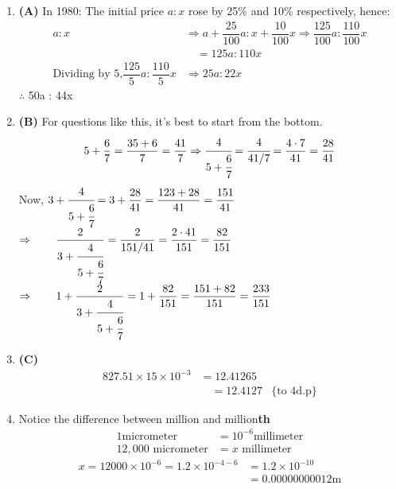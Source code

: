 \begin{multicols}{2}
\begin{enumerate}[label={\textbf{\arabic*.}}]
    \item \textbf{(A)} In 1980: The initial price \(a : x\) rose by 25\% and 10\% respectively, hence:
    \begin{align*}
    a:x &\Rightarrow a + \dfrac{25}{100}a : x + \dfrac{10}{100}x \Rightarrow \dfrac{125}{100}a : \dfrac{110}{100}x \\
    &\quad = 125a : 110x \\
    \text{Dividing by 5,} \dfrac{125}{5} a : \dfrac{110}{5} x &\Rightarrow 25a : 22x
    \end{align*}
    \(\therefore\)  \hspace{20px} 50a : 44x
    
    \item \textbf{(B)} For questions like this, it's best to start from the bottom.
    \[5 + \dfrac{6}{7} = \dfrac{35 + 6}{7} = \dfrac{41}{7} \Rightarrow \cfrac{4}{5 + \cfrac{6}{7}} = \cfrac{4}{41/7} = \dfrac{4 \cdot 7}{41} = \dfrac{28}{41}\]
    Now, \(3 + \cfrac{4}{5 + \cfrac{6}{7}} = 3 + \dfrac{28}{41} = \dfrac{123 + 28}{41} = \dfrac{151}{41}\)
    \vspace{10pt}
    \(\Rightarrow \hspace{20px} \dfrac{2}{3 + \cfrac{4}{5 + \cfrac{6}{7}}} = \dfrac{2}{151/41} = \dfrac{2 \cdot 41}{151} = \dfrac{82}{151}\)
    \vspace{10pt}
    \(\Rightarrow \hspace{20px} 1 + \dfrac{2}{3 + \cfrac{4}{5 + \cfrac{6}{7}}} = 1 + \dfrac{82}{151} = \dfrac{151 + 82}{151} = \dfrac{233}{151}\)

    
    \item \textbf{(C)}\begin{align*}
        827.51 \times 15 \times 10^{-3} &= 12.41265 \\
        &\quad = 12.4127  &\text{\{ to 4d.p\}}
        \end{align*}
    \item Notice the difference between million and million\textbf{th} 
    \begin{align*}
     1 \text{micrometer} &= 10^{-6}\text{millimeter} \\
    12,000 \text{ micrometer} &= x \text{ millimeter} 
    \end{align*}
    \begin{align*}
    x = 12000 \times 10^{-6}  = 1.2 \times 10^{-4 -6 } &= 1.2 \times 10^{-10} \\ &= 0.00000000012 \textrm{m}
    \end{align*}


\end{enumerate}
\end{multicols}
